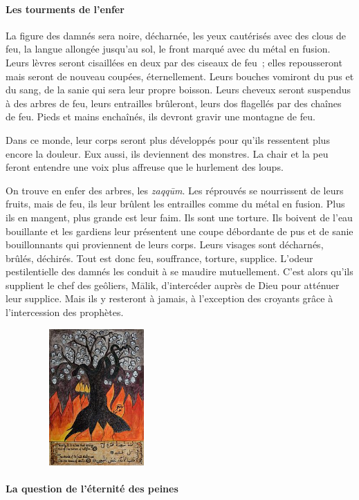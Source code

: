  
\paragraph{Les tourments de
l'enfer}\label{les-tourments-de-lenfer}

La figure des damnés sera noire, décharnée, les yeux cautérisés avec des
clous de feu, la langue allongée jusqu'au sol, le front marqué avec du
métal en fusion. Leurs lèvres seront cisaillées en deux par des ciseaux
de feu~; elles repousseront mais seront de nouveau coupées,
éternellement. Leurs bouches vomiront du pus et du sang, de la sanie qui
sera leur propre boisson. Leurs cheveux seront suspendus à des arbres de
feu, leurs entrailles brûleront, leurs dos flagellés par des chaînes de
feu. Pieds et mains enchaînés, ils devront gravir une montagne de feu.

Dans ce monde, leur corps seront plus développés pour qu'ils ressentent
plus encore la douleur. Eux aussi, ils deviennent des monstres. La chair
et la peu feront entendre une voix plus affreuse que le hurlement des
loups.

On trouve en enfer des arbres, les \emph{zaqqūm}. Les réprouvés se
nourrissent de leurs fruits, mais de feu, ils leur brûlent les
entrailles comme du métal en fusion. Plus ils en mangent, plus grande
est leur faim. Ils sont une torture. Ils boivent de l'eau bouillante et
les gardiens leur présentent une coupe débordante de pus et de sanie
bouillonnants qui proviennent de leurs corps. Leurs visages sont
décharnés, brûlés, déchirés. Tout est donc feu, souffrance, torture,
supplice. L'odeur pestilentielle des damnés les conduit à se maudire
mutuellement. C'est alors qu'ils supplient le chef des geôliers, Mālik,
d'intercéder auprès de Dieu pour atténuer leur supplice. Mais ils y
resteront à jamais, à l'exception des croyants grâce à l'intercession
des prophètes.

\includegraphics[width=2.73901in,height=2.05312in]{Images/Zaqqum.jpg}


\paragraph{La question de l'éternité des
peines}\label{la-question-de-luxe9ternituxe9-des-peines}

